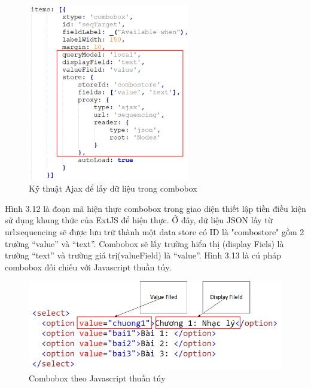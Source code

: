 		\begin{center}
	\begin{figure}[htp]
		\begin{center}
			\includegraphics[width=7cm]{Chapter3/Pictures/picture312.png}
		\end{center}
		\caption{Kỹ thuật Ajax để lấy dữ liệu trong combobox}
		\label{refpicture413}
	\end{figure}
\end{center}


	Hình 3.12 là đoạn mã hiện thực combobox trong giao diện thiết lập tiền điều kiện sử dụng khung thức của ExtJS để hiện thực. Ở đây, dữ liệu JSON lấy từ url:sequencing sẽ được lưu trữ thành một data store có ID là "combostore" gồm 2 trường “value” và “text”. Combobox sẽ lấy trường hiển thị (display Fiels) là trường “text” và trường giá trị(valueField) là “value”. Hình 3.13 là cú pháp combobox đối chiếu với Javascript thuần túy.

		\begin{center}
	\begin{figure}[htp]
		\begin{center}
			\includegraphics[width=15cm]{Chapter3/Pictures/picture313.png}
		\end{center}
		\caption{Combobox theo Javascript thuần túy}
		\label{refpicture413}
	\end{figure}
\end{center}


